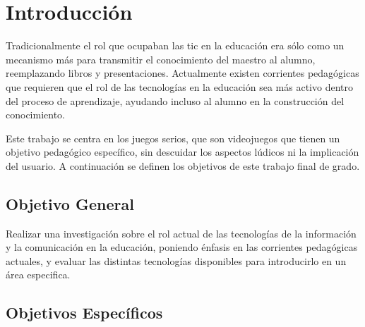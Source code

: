 
\section{Introducción}

Tradicionalmente el rol que ocupaban las \Gls{tic} en la educación era sólo como un mecanismo más para transmitir el
conocimiento del maestro al alumno, reemplazando libros y
presentaciones\cite{laptop:instructionism}. Actualmente existen corrientes
pedagógicas que requieren que el rol de las tecnologías en la educación sea 
más activo dentro del proceso de aprendizaje, ayudando incluso al alumno en la
construcción del conocimiento.

Este trabajo se centra en los juegos serios, que son videojuegos que tienen
un objetivo pedagógico específico, sin descuidar los aspectos lúdicos ni la
implicación del usuario\cite{sg:aoverview,ludus:sg}. A continuación se definen 
los objetivos de este trabajo final de grado.

\subsection{Objetivo General}

Realizar una investigación sobre el rol actual de las tecnologías de la
información y la comunicación en la educación, poniendo énfasis en las 
corrientes pedagógicas actuales, y evaluar las distintas tecnologías 
disponibles para introducirlo en un área especifica.

\subsection{Objetivos Específicos}

